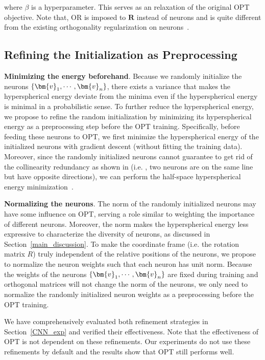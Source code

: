  where $\beta$ is a hyperparameter. This serves as an relaxation of the original OPT objective. Note that, OR is imposed to $\bm{R}$ instead of neurons and is quite different from the existing orthogonality regularization on neurons~\cite{liu2017deep,bansal2018can,huang2018orthogonal,xie2017all,brock2016neural}.

\subsection{Refining the Initialization as Preprocessing}\label{refine_neuron}

\textbf{Minimizing the energy beforehand}. Because we randomly initialize the neurons $\thickmuskip=2mu \medmuskip=2mu \{\bm{v}_1,\cdots,\bm{v}_n\}$, there exists a variance that makes the hyperspherical energy deviate from the minima even if the hyperspherical energy is minimal in a probabilistic sense. To further reduce the hyperspherical energy, we propose to refine the random initialization by minimizing its hyperspherical energy as a preprocessing step before the OPT training. Specifically, before feeding these neurons to OPT, we first minimize the hyperspherical energy of the initialized neurons with gradient descent (without fitting the training data). Moreover, since the randomly initialized neurons cannot guarantee to get rid of the collinearity redundancy as shown in \cite{liu2018learning} (i.e. , two neurons are on the same line but have opposite directions), we can perform the half-space hyperspherical energy minimization~\cite{liu2018learning}.

\textbf{Normalizing the neurons}. The norm of the randomly initialized neurons may have some influence on OPT, serving a role similar to weighting the importance of different neurons. Moreover, the norm makes the hyperspherical energy less expressive to characterize the diversity of neurons, as discussed in Section~\ref{main_discussion}. To make the coordinate frame (i.e. the rotation matrix $R$) truly independent of the relative positions of the neurons, we propose to normalize the neuron weights such that each neuron has unit norm. Because the weights of the neurons $\thickmuskip=2mu \medmuskip=2mu \{\bm{v}_1,\cdots,\bm{v}_n\}$ are fixed during training and orthogonal matrices will not change the norm of the neurons, we only need to normalize the randomly initialized neuron weights as a preprocessing before the OPT training.

We have comprehensively evaluated both refinement strategies in Section~\ref{CNN_exp} and verified their effectiveness. Note that the effectiveness of OPT is not dependent on these refinements. Our experiments do not use these refinements by default and the results show that OPT still performs well.

